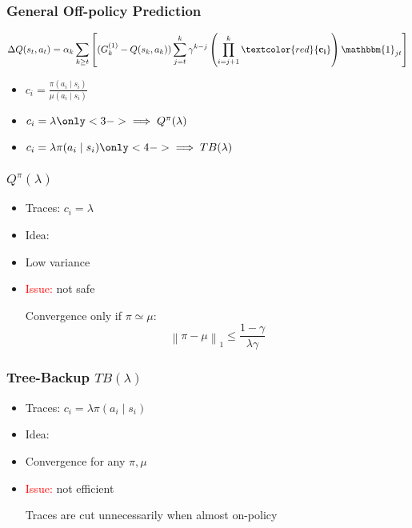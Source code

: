 \documentclass{beamer}
\newcommand{\norm}[2][\infty]{\left\|#2\right\|_{#1}}
\begin{document}
\begin{frame}
\frametitle{General Off-policy Prediction}
\begin{align*}
	\Delta Q(s_t,a_t) =
	\alpha_k
	\sum_{k\geq t}\left[
	(G_k^{(1)} - Q(s_k,a_k))
	\sum_{j=t}^k\gamma^{k-j}
	\left(\prod_{i=j+1}^k \textcolor{red}{\bf{c_i}}\right)
	\mathbbm{1}_{jt}
	\right]
\end{align*}
\begin{itemize}
\item $c_i = \frac{\pi(a_i\mid s_i)}{\mu(a_i\mid s_i)}$ 
\item $c_i = \lambda  
\only<3->{\implies Q^{\pi}(\lambda)}$ 
\item $c_i = \lambda\pi(a_i\mid s_i) 
 \only<4->{\implies TB(\lambda)}$
\end{itemize}
\end{frame}

\begin{frame}
\frametitle{$Q^{\pi}(\lambda)$}
\begin{itemize}
\item Traces: $c_i = \lambda$
\item Idea: 
\item Low variance
\item \textcolor{red}{Issue:} not safe

Convergence only if $\pi\simeq\mu$:
\[
	\norm[1]{\pi-\mu} \leq \frac{1-\gamma}{\lambda\gamma}
\]
\end{itemize}
\end{frame}

\begin{frame}
\frametitle{Tree-Backup $TB(\lambda)$}
\begin{itemize}
\item Traces: $c_i = \lambda\pi(a_i\mid s_i)$
\item Idea: 
\item Convergence for any $\pi,\mu$
\item \textcolor{red}{Issue:} not efficient

Traces are cut unnecessarily when almost on-policy
\end{itemize}
\end{frame}
\end{document}
